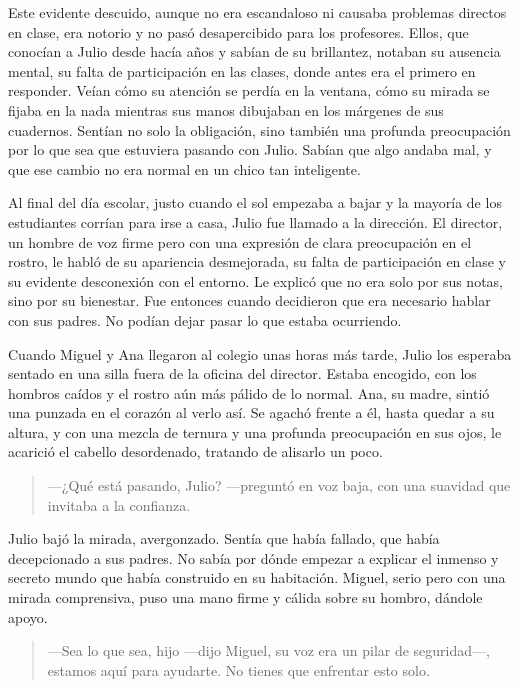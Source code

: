 \documentclass[a4paper,12pt]{book}
\begin{document}
Este evidente descuido, aunque no era escandaloso ni causaba problemas directos en clase, era notorio y no pasó desapercibido para los profesores. Ellos, que conocían a Julio desde hacía años y sabían de su brillantez, notaban su ausencia mental, su falta de participación en las clases, donde antes era el primero en responder. Veían cómo su atención se perdía en la ventana, cómo su mirada se fijaba en la nada mientras sus manos dibujaban en los márgenes de sus cuadernos. Sentían no solo la obligación, sino también una profunda preocupación por lo que sea que estuviera pasando con Julio. Sabían que algo andaba mal, y que ese cambio no era normal en un chico tan inteligente.

Al final del día escolar, justo cuando el sol empezaba a bajar y la mayoría de los estudiantes corrían para irse a casa, Julio fue llamado a la dirección. El director, un hombre de voz firme pero con una expresión de clara preocupación en el rostro, le habló de su apariencia desmejorada, su falta de participación en clase y su evidente desconexión con el entorno. Le explicó que no era solo por sus notas, sino por su bienestar. Fue entonces cuando decidieron que era necesario hablar con sus padres. No podían dejar pasar lo que estaba ocurriendo.

Cuando Miguel y Ana llegaron al colegio unas horas más tarde, Julio los esperaba sentado en una silla fuera de la oficina del director. Estaba encogido, con los hombros caídos y el rostro aún más pálido de lo normal. Ana, su madre, sintió una punzada en el corazón al verlo así. Se agachó frente a él, hasta quedar a su altura, y con una mezcla de ternura y una profunda preocupación en sus ojos, le acarició el cabello desordenado, tratando de alisarlo un poco.

\begin{quote}
    —¿Qué está pasando, Julio? —preguntó en voz baja, con una suavidad que invitaba a la confianza.
\end{quote}

Julio bajó la mirada, avergonzado. Sentía que había fallado, que había decepcionado a sus padres. No sabía por dónde empezar a explicar el inmenso y secreto mundo que había construido en su habitación. Miguel, serio pero con una mirada comprensiva, puso una mano firme y cálida sobre su hombro, dándole apoyo.

\begin{quote}
    —Sea lo que sea, hijo —dijo Miguel, su voz era un pilar de seguridad—, estamos aquí para ayudarte. No tienes que enfrentar esto solo.
\end{quote}
\end{document}

